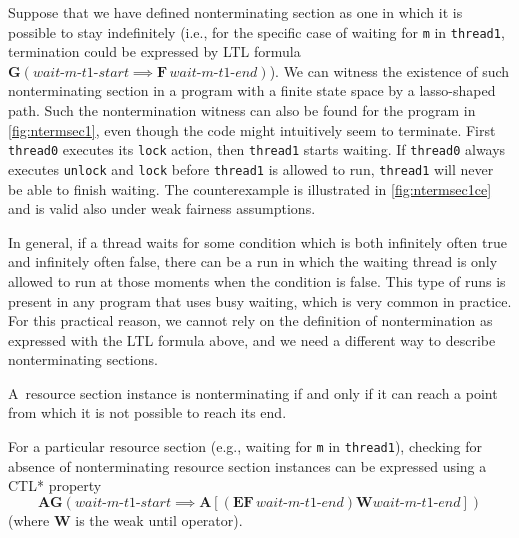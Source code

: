 Suppose that we have defined nonterminating section as one in which it is possible to stay indefinitely (i.e., for the specific case of waiting for \texttt{m} in \texttt{thread1}, termination could be expressed by LTL formula $\mathbf{G}(\textit{wait-m-t1-start} \implies \mathbf{F}\,\textit{wait-m-t1-end})$).
We can witness the existence of such nonterminating section in a program with a finite state
space by a lasso-shaped path. Such the nontermination witness can also be found
for the program in \autoref{fig:ntermsec1}, even though the code might intuitively seem to
terminate.
First \texttt{thread0} executes its \texttt{lock} action, then \texttt{thread1} starts waiting.
If \texttt{thread0} always executes \texttt{unlock} and \texttt{lock} before
\texttt{thread1} is allowed to run, \texttt{thread1} will never be able to finish waiting.
The counterexample is illustrated in \autoref{fig:ntermsec1ce} and is valid also under weak fairness assumptions.

In general, if a thread waits for some condition which is both infinitely often true and infinitely often false, there can be a run in which the waiting thread is only allowed to run at those moments when the condition is false. This type of runs is present in any program that uses busy waiting, which is very common in practice.
For this practical reason, we
cannot rely on the definition of nontermination as expressed with the LTL
formula above, and we need a different way to describe nonterminating sections.
\begin{definition}\label{def:lnterm}
A~resource section instance is nonterminating if and only if it can reach a point from which it is not possible to reach its end.
\end{definition}

For a particular resource section (e.g., waiting for \texttt{m} in \texttt{thread1}), checking for absence of nonterminating resource section instances can be expressed using a CTL* property \[ \mathbf{AG}\left(\textit{wait-m-t1-start} \implies \mathbf{A}[(\mathbf{EF}\,\textit{wait-m-t1-end}) \mathbin{\mathbf{W}} \textit{wait-m-t1-end}]\right) \] (where $\mathbf{W}$ is the weak until operator).

